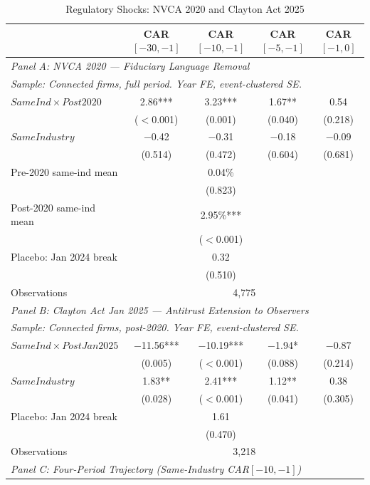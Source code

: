 \begin{table}[htbp]
\centering
\begin{threeparttable}
\caption{Regulatory Shocks: NVCA 2020 and Clayton Act 2025}
\label{tab:shocks}
\small
\begin{tabular}{lcccc}
\toprule
 & CAR$[-30,-1]$ & CAR$[-10,-1]$ & CAR$[-5,-1]$ & CAR$[-1,0]$ \\
\midrule
\multicolumn{5}{l}{\textit{Panel A: NVCA 2020 --- Fiduciary Language Removal}} \\
\multicolumn{5}{l}{\textit{Sample: Connected firms, full period. Year FE, event-clustered SE.}} \\
\midrule
$SameInd \times Post2020$ & 2.86*** & 3.23*** & 1.67** & 0.54 \\
 & ($<$0.001) & (0.001) & (0.040) & (0.218) \\[0.2em]
$SameIndustry$ & $-$0.42 & $-$0.31 & $-$0.18 & $-$0.09 \\
 & (0.514) & (0.472) & (0.604) & (0.681) \\[0.3em]
Pre-2020 same-ind mean &  & 0.04\% &  & \\
 &  & (0.823) &  & \\
Post-2020 same-ind mean &  & 2.95\%*** &  & \\
 &  & ($<$0.001) &  & \\[0.3em]
Placebo: Jan 2024 break &  & 0.32 &  & \\
 &  & (0.510) &  & \\[0.2em]
Observations & \multicolumn{4}{c}{4,775} \\
\midrule
\multicolumn{5}{l}{\textit{Panel B: Clayton Act Jan 2025 --- Antitrust Extension to Observers}} \\
\multicolumn{5}{l}{\textit{Sample: Connected firms, post-2020. Year FE, event-clustered SE.}} \\
\midrule
$SameInd \times PostJan2025$ & $-$11.56*** & $-$10.19*** & $-$1.94* & $-$0.87 \\
 & (0.005) & ($<$0.001) & (0.088) & (0.214) \\[0.2em]
$SameIndustry$ & 1.83** & 2.41*** & 1.12** & 0.38 \\
 & (0.028) & ($<$0.001) & (0.041) & (0.305) \\[0.3em]
Placebo: Jan 2024 break &  & 1.61 &  & \\
 &  & (0.470) &  & \\[0.2em]
Observations & \multicolumn{4}{c}{3,218} \\
\midrule
\multicolumn{5}{l}{\textit{Panel C: Four-Period Trajectory (Same-Industry CAR$[-10,-1]$)}} \\

\end{tabular}
\end{threeparttable}
\end{table}
